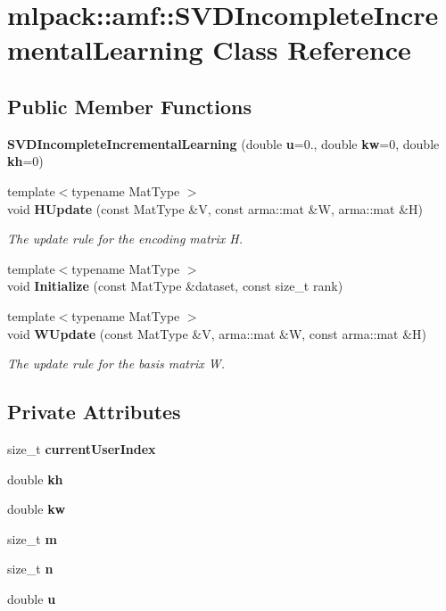 \section{mlpack\-:\-:amf\-:\-:S\-V\-D\-Incomplete\-Incremental\-Learning Class Reference}
\label{classmlpack_1_1amf_1_1SVDIncompleteIncrementalLearning}
\subsection*{Public Member Functions}
\begin{DoxyCompactItemize}
\item 
{\bf S\-V\-D\-Incomplete\-Incremental\-Learning} (double {\bf u}=0., double {\bf kw}=0, double {\bf kh}=0)
\item 
{\footnotesize template$<$typename Mat\-Type $>$ }\\void {\bf H\-Update} (const Mat\-Type \&V, const arma\-::mat \&W, arma\-::mat \&H)
\begin{DoxyCompactList}\small\item\em The update rule for the encoding matrix H. \end{DoxyCompactList}\item 
{\footnotesize template$<$typename Mat\-Type $>$ }\\void {\bf Initialize} (const Mat\-Type \&dataset, const size\-\_\-t rank)
\item 
{\footnotesize template$<$typename Mat\-Type $>$ }\\void {\bf W\-Update} (const Mat\-Type \&V, arma\-::mat \&W, const arma\-::mat \&H)
\begin{DoxyCompactList}\small\item\em The update rule for the basis matrix W. \end{DoxyCompactList}\end{DoxyCompactItemize}
\subsection*{Private Attributes}
\begin{DoxyCompactItemize}
\item 
size\-\_\-t {\bf current\-User\-Index}
\item 
double {\bf kh}
\item 
double {\bf kw}
\item 
size\-\_\-t {\bf m}
\item 
size\-\_\-t {\bf n}
\item 
double {\bf u}
\end{DoxyCompactItemize}


